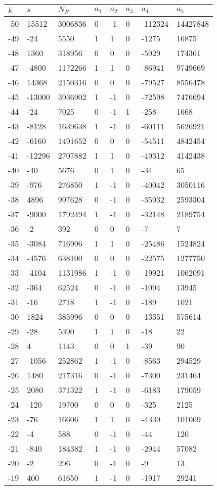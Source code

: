 \documentclass{amsart}
\begin{document}
\begin{longtable}{|l|l|l|lllll|}
\hline
$k$ & $s$ & $N_E$ & $a_1$ & $a_2$ & $a_3$ & $a_4$ & $a_5$\\
\hline
-50&15512&3006836&0&-1&0&-112324&14427848\\
-49&-24&5550&1&1&0&-1275&16875\\
-48&1360&318956&0&0&0&-5929&174361\\
-47&-4800&1172266&1&1&0&-86941&9749669\\
-46&14368&2150316&0&0&0&-79527&8556478\\
-45&-13000&3936902&1&-1&0&-72598&7476694\\
-44&-24&7025&0&-1&1&-258&1668\\
-43&-8128&1639638&1&-1&0&-60111&5626921\\
-42&-6160&1491652&0&0&0&-54511&4842454\\
-41&-12296&2707882&1&1&0&-49312&4142438\\
-40&-40&5676&0&1&0&-34&65\\
-39&-976&276850&1&-1&0&-40042&3050116\\
-38&4896&997628&0&-1&0&-35932&2593304\\
-37&-9000&1792494&1&-1&0&-32148&2189754\\
-36&-2&392&0&0&0&-7&7\\
-35&-3084&716906&1&1&0&-25486&1524824\\
-34&-4576&638100&0&0&0&-22575&1277750\\
-33&-4104&1131986&1&-1&0&-19921&1062091\\
-32&-364&62524&0&-1&0&-1094&13945\\
-31&-16&2718&1&-1&0&-189&1021\\
-30&1824&385996&0&0&0&-13351&575614\\
-29&-28&5390&1&1&0&-18&22\\
-28&4&1143&0&0&1&-39&90\\
-27&-1056&252862&1&-1&0&-8563&294529\\
-26&1480&217316&0&-1&0&-7300&231464\\
-25&2080&371322&1&-1&0&-6183&179059\\
-24&-120&19700&0&0&0&-325&2125\\
-23&-76&16606&1&1&0&-4339&101069\\
-22&-4&588&0&-1&0&-44&120\\
-21&-840&184382&1&-1&0&-2944&57082\\
-20&-2&296&0&-1&0&-9&13\\
-19&400&61650&1&-1&0&-1917&29241\\

\end{longtable}
\end{document}
